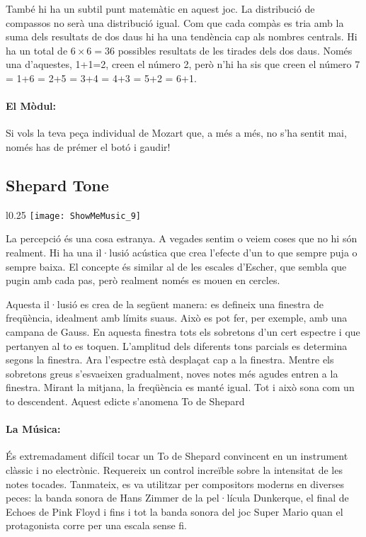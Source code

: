 També hi ha un subtil punt matemàtic en aquest joc. La distribució de compassos no serà una distribució igual. Com que cada compàs es tria amb la suma dels resultats de dos daus hi ha una tendència cap als nombres centrals. Hi ha un total de $6\times 6=36$ possibles resultats de les tirades dels dos daus. Només una d'aquestes, 1+1=2, creen el número 2, però n'hi ha sis que creen el número 7 = 1+6 = 2+5 = 3+4 = 4+3 = 5+2 = 6+1.

\paragraph{El Mòdul:} Si vols la teva peça individual de Mozart que, a més a més, no s'ha sentit mai, només has de prémer el botó i gaudir!

\subsection{Shepard Tone}

\begin{wrapfigure}[39]{l}{0.25\textwidth}
\centering
\texttt{[image: ShowMeMusic\_9]}
\end{wrapfigure}

La percepció és una cosa estranya. A vegades sentim o veiem coses que no hi són realment. Hi ha una il·lusió acústica que crea l'efecte d'un to que sempre puja o sempre baixa. El concepte és similar al de les escales d'Escher, que sembla que pugin amb cada pas, però realment només es mouen en cercles.

Aquesta il·lusió es crea de la següent manera: es defineix una finestra de freqüència, idealment amb límits suaus. Això es pot fer, per exemple, amb una campana de Gauss. En aquesta finestra tots els sobretons d'un cert espectre i que pertanyen al to es toquen. L'amplitud dels diferents tons parcials es determina segons la finestra. Ara l'espectre està desplaçat cap a la finestra. Mentre els sobretons greus s'esvaeixen gradualment, noves notes més agudes entren a la finestra. Mirant la mitjana, la freqüència es manté igual. Tot i això sona com un to descendent. Aquest edicte s'anomena To de Shepard

\paragraph{La Música:} És extremadament difícil tocar un To de Shepard convincent en un instrument clàssic i no electrònic. Requereix un control increïble sobre la intensitat de les notes tocades. Tanmateix, es va utilitzar per compositors moderns en diverses peces: la banda sonora de Hans Zimmer de la pel·lícula Dunkerque, el final de Echoes de Pink Floyd i fins i tot la banda sonora del joc Super Mario quan el protagonista corre per una escala sense fi.

